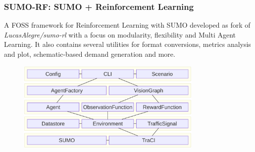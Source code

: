 \documentclass[dvipsnames]{beamer}
\begin{document}
\begin{frame}
\begin{columns}
\begin{column}{0.6\textwidth}
\begin{figure}
      \end{figure}
    \end{column}
  \end{columns}
\end{frame}

\begin{frame}
\frametitle{SUMO-RF: SUMO + Reinforcement Learning}
  A FOSS framework for Reinforcement Learning with SUMO developed as fork of \textit{LucasAlegre/sumo-rl} with a focus on modularity, flexibility and Multi Agent Learning.
  It also contains several utilities for format conversions, metrics analysis and plot, schematic-based demand generation and more.
  \begin{figure}
    \centering
    \includegraphics[width=0.8\textwidth]{figures/sumo-rf-architecture.png}
  \end{figure}
\end{frame}
\end{document}
